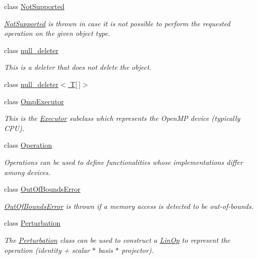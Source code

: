 \begin{DoxyCompactItemize}
class \hyperlink{classgko_1_1NotSupported}{Not\+Supported}
\begin{DoxyCompactList}\small\item\em \hyperlink{classgko_1_1NotSupported}{Not\+Supported} is thrown in case it is not possible to perform the requested operation on the given object type. \end{DoxyCompactList}\item 
class \hyperlink{classgko_1_1null__deleter}{null\+\_\+deleter}
\begin{DoxyCompactList}\small\item\em This is a deleter that does not delete the object. \end{DoxyCompactList}\item 
class \hyperlink{classgko_1_1null__deleter_3_01T[]_4}{null\+\_\+deleter$<$ T\mbox{[}$\,$\mbox{]}$>$}
\item 
class \hyperlink{classgko_1_1OmpExecutor}{Omp\+Executor}
\begin{DoxyCompactList}\small\item\em This is the \hyperlink{classgko_1_1Executor}{Executor} subclass which represents the Open\+MP device (typically C\+PU). \end{DoxyCompactList}\item 
class \hyperlink{classgko_1_1Operation}{Operation}
\begin{DoxyCompactList}\small\item\em Operations can be used to define functionalities whose implementations differ among devices. \end{DoxyCompactList}\item 
class \hyperlink{classgko_1_1OutOfBoundsError}{Out\+Of\+Bounds\+Error}
\begin{DoxyCompactList}\small\item\em \hyperlink{classgko_1_1OutOfBoundsError}{Out\+Of\+Bounds\+Error} is thrown if a memory access is detected to be out-\/of-\/bounds. \end{DoxyCompactList}\item 
class \hyperlink{classgko_1_1Perturbation}{Perturbation}
\begin{DoxyCompactList}\small\item\em The \hyperlink{classgko_1_1Perturbation}{Perturbation} class can be used to construct a \hyperlink{classgko_1_1LinOp}{Lin\+Op} to represent the operation {\ttfamily (identity + scalar $\ast$ basis $\ast$ projector)}. \end{DoxyCompactList}\item 

\end{DoxyCompactItemize}
